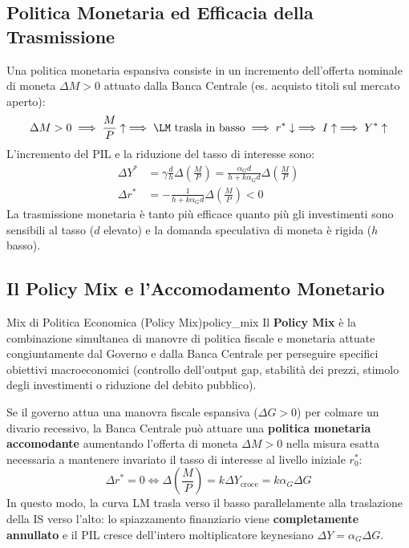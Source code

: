 \subsection{Politica Monetaria ed Efficacia della Trasmissione}
Una politica monetaria espansiva consiste in un incremento dell'offerta nominale di moneta $\Delta M > 0$ attuato dalla Banca Centrale (es. acquisto titoli sul mercato aperto):
\begin{equation}
    \Delta M > 0 \implies \frac{M}{P} \uparrow \implies \LM \text{ trasla in basso} \implies r^* \downarrow \implies I \uparrow \implies Y^* \uparrow
\end{equation}
L'incremento del PIL e la riduzione del tasso di interesse sono:
\begin{align}
    \Delta Y^* &= \gamma \frac{d}{h} \Delta\left(\frac{M}{P}\right) = \frac{\alpha_G d}{h + k \alpha_G d} \Delta\left(\frac{M}{P}\right) \\
    \Delta r^* &= -\frac{1}{h + k \alpha_G d} \Delta\left(\frac{M}{P}\right) < 0
\end{align}
La trasmissione monetaria è tanto più efficace quanto più gli investimenti sono sensibili al tasso ($d$ elevato) e la domanda speculativa di moneta è rigida ($h$ basso).

\subsection{Il Policy Mix e l'Accomodamento Monetario}

\begin{definizione}{Mix di Politica Economica (Policy Mix)}{policy_mix}
Il \textbf{Policy Mix} è la combinazione simultanea di manovre di politica fiscale e monetaria attuate congiuntamente dal Governo e dalla Banca Centrale per perseguire specifici obiettivi macroeconomici (controllo dell'output gap, stabilità dei prezzi, stimolo degli investimenti o riduzione del debito pubblico).
\end{definizione}

\begin{esempio}
Se il governo attua una manovra fiscale espansiva ($\Delta G > 0$) per colmare un divario recessivo, la Banca Centrale può attuare una \textbf{politica monetaria accomodante} aumentando l'offerta di moneta $\Delta M > 0$ nella misura esatta necessaria a mantenere invariato il tasso di interesse al livello iniziale $r_0^*$:
\begin{equation}
    \Delta r^* = 0 \iff \Delta\left(\frac{M}{P}\right) = k \Delta Y_{\text{croce}} = k \alpha_G \Delta G
\end{equation}
In questo modo, la curva LM trasla verso il basso parallelamente alla traslazione della IS verso l'alto: lo spiazzamento finanziario viene \textbf{completamente annullato} e il PIL cresce dell'intero moltiplicatore keynesiano $\Delta Y = \alpha_G \Delta G$.
\end{esempio}

